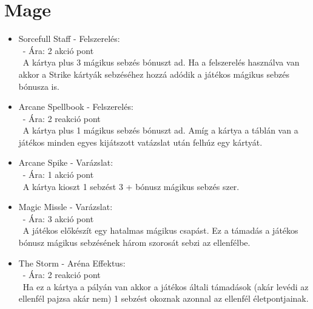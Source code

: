 \section{Mage}
\begin{itemize}
    \item Sorcefull Staff - Felszerelés:\\\
    - Ára: 2 akció pont \\\
    A kártya plus 3 mágikus sebzés bónuszt ad. Ha a felszerelés használva van akkor a Strike kártyák sebzéséhez hozzá adódik a játékos mágikus sebzés bónusza is. 
    \item Arcane Spellbook - Felszerelés:\\\
    - Ára: 2 reakció pont \\\
    A kártya plus 1 mágikus sebzés bónuszt ad. Amíg a kártya a táblán van a játékos minden egyes kijátszott vatázslat után felhúz egy kártyát.
    \item Arcane Spike - Varázslat:\\\
    - Ára: 1 akció pont \\\
    A kártya kioszt 1 sebzést 3 + bónusz mágikus sebzés szer.
    \item Magic Missle - Varázslat:\\\
    - Ára: 3 akció pont \\\
    A játékos előkészít egy hatalmas mágikus csapást. Ez a támadás a játékos bónusz mágikus sebzésének három szorosát sebzi az ellenfélbe.
    \item The Storm - Aréna Effektus:\\\
    - Ára: 2 reakció pont \\\
    Ha ez a kártya a pályán van akkor a játékos általi támadások (akár levédi az ellenfél pajzsa akár nem) 1 sebzést okoznak azonnal az ellenfél életpontjainak.
\end{itemize}

